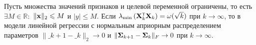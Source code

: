 \begin{theorem}[Киселев, 2024]\label{theorem4}
    Пусть множества значений признаков и целевой переменной ограничены, то есть $\exists M \in \mathbb{R}:$ $\| \mathbf{x} \|_2 \leqslant M$ и $|y| \leqslant M$. Если  $\lambda_{\min}\left( \bX\T_k \bX_k \right) = \omega(\sqrt{k})$ при $k \to \infty$, то в модели линейной регрессии с нормальным априорным распределением параметров $\| \bm_{k+1} - \bm_k \|_2 \to 0$ и  $\| \boldsymbol{\Sigma}_{k+1} - \boldsymbol{\Sigma}_k \|_{F} \to 0$ при $k \to \infty$.
\end{theorem}